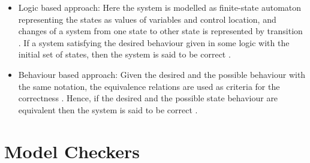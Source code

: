 \documentclass[a4paper,12pt]{report}
\begin{document}
\begin{onehalfspacing}
\begin{itemize}
\item Logic based approach: Here the system is modelled as finite-state automaton representing the states as values of variables and control location, and changes of a system from one state to other state is represented by transition \cite{DanielJackson2004}. If a system satisfying the desired behaviour given in some logic with the initial set of states, then the system is said to be correct \cite{DanielJackson2004}.
\item Behaviour based approach: Given the desired and the possible behaviour with the same notation, the equivalence relations are used as criteria for the correctness \cite{DanielJackson2004}. Hence, if the desired and the possible state behaviour are equivalent then the system is said to be correct \cite{DanielJackson2004}.  
\end{itemize}

\section{Model Checkers}


\end{onehalfspacing}
\end{document}
